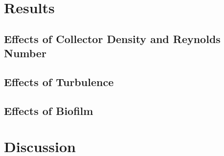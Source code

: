 \documentclass{article}
\begin{document}
\section{Results}

\subsection{Effects of Collector Density and Reynolds Number}

\subsection{Effects of Turbulence}

\subsection{Effects of Biofilm}

\section{Discussion}
\end{document}
